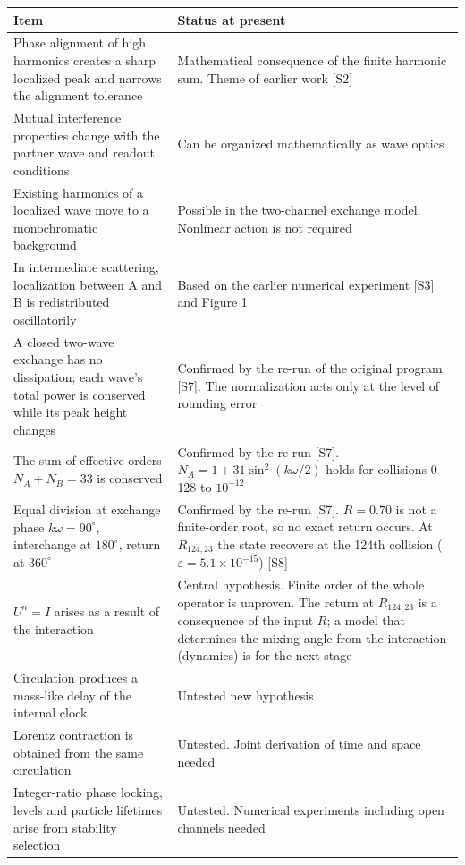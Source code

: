\documentclass[
  a4paper,
]{article}
\newcounter{none} %
\begin{document}
{\def\LTcaptype{none} %
\begin{longtable}[]{@{}
  >{\raggedright\arraybackslash}p{}
  >{\raggedright\arraybackslash}p{}@{}}
\toprule\noalign{}
\begin{minipage}[b]{\linewidth}\raggedright
Item
\end{minipage} & \begin{minipage}[b]{\linewidth}\raggedright
Status at present
\end{minipage} \\
\midrule\noalign{}
\endhead
\bottomrule\noalign{}
\endlastfoot
Phase alignment of high harmonics creates a sharp localized peak and
narrows the alignment tolerance & Mathematical consequence of the finite
harmonic sum. Theme of earlier work {[}S2{]} \\
Mutual interference properties change with the partner wave and readout
conditions & Can be organized mathematically as wave optics \\
Existing harmonics of a localized wave move to a monochromatic
background & Possible in the two-channel exchange model. Nonlinear
action is not required \\
In intermediate scattering, localization between A and B is
redistributed oscillatorily & Based on the earlier numerical experiment
{[}S3{]} and Figure 1 \\
A closed two-wave exchange has no dissipation; each wave's total power
is conserved while its peak height changes & Confirmed by the re-run of
the original program {[}S7{]}. The normalization acts only at the level
of rounding error \\
The sum of effective orders \(N_A+N_B=33\) is conserved & Confirmed by
the re-run {[}S7{]}. \(N_A=1+31\sin^2(k\omega/2)\) holds for collisions
0--128 to \(10^{-12}\) \\
Equal division at exchange phase \(k\omega=90^\circ\), interchange at
\(180^\circ\), return at \(360^\circ\) & Confirmed by the re-run
{[}S7{]}. \(R=0.70\) is not a finite-order root, so no exact return
occurs. At \(R_{124,23}\) the state recovers at the 124th collision
(\(\varepsilon=5.1\times10^{-15}\)) {[}S8{]} \\
\(U^n=I\) arises as a result of the interaction & Central hypothesis.
Finite order of the whole operator is unproven. The return at
\(R_{124,23}\) is a consequence of the input \(R\); a model that
determines the mixing angle from the interaction (dynamics) is for the
next stage \\
Circulation produces a mass-like delay of the internal clock & Untested
new hypothesis \\
Lorentz contraction is obtained from the same circulation & Untested.
Joint derivation of time and space needed \\
Integer-ratio phase locking, levels and particle lifetimes arise from
stability selection & Untested. Numerical experiments including open
channels needed \\
\end{longtable}
}
\end{document}
